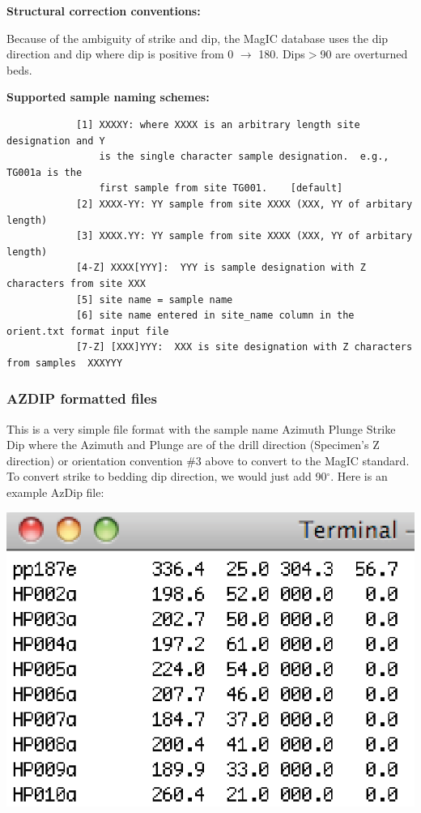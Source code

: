 \documentclass[11pt]{book}
\begin{document}
{{\bf Structural correction conventions:}
        

Because of the ambiguity of strike and dip, the MagIC database uses the dip direction and dip where dip is positive from 0 $\rightarrow$ 180. Dips$ > $90 are overturned beds. 


{\bf Supported sample naming schemes:}

\begin{verbatim}
            [1] XXXXY: where XXXX is an arbitrary length site designation and Y
                is the single character sample designation.  e.g., TG001a is the
                first sample from site TG001.    [default]
            [2] XXXX-YY: YY sample from site XXXX (XXX, YY of arbitary length)
            [3] XXXX.YY: YY sample from site XXXX (XXX, YY of arbitary length)
            [4-Z] XXXX[YYY]:  YYY is sample designation with Z characters from site XXX
            [5] site name = sample name
            [6] site name entered in site_name column in the orient.txt format input file  
            [7-Z] [XXX]YYY:  XXX is site designation with Z characters from samples  XXXYYY
\end{verbatim}

\subsubsection{AZDIP formatted files}
This is a very simple file format with the sample name Azimuth Plunge Strike Dip where the Azimuth and Plunge are of the drill direction (Specimen's Z direction) or orientation convention \#3 above to convert to the MagIC standard. To convert strike to bedding dip direction, we would just add 90$^{\circ}$. Here is an example AzDip file:

\includegraphics[width=15cm]{EPSfiles/azdip.eps}

}
\end{document}

